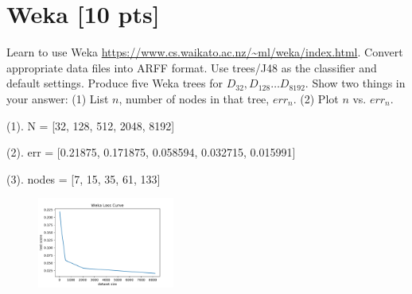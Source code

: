 \documentclass[a4paper]{article}
\theoremstyle{definition}
\newenvironment{soln}{
    \leavevmode\color{blue}\ignorespaces
}{}
\begin{document}
\section{Weka [10 pts]}
Learn to use Weka \url{https://www.cs.waikato.ac.nz/~ml/weka/index.html}.
Convert appropriate data files into ARFF format.
Use trees/J48 as the classifier and default settings.
Produce five Weka trees for $D_{32}, D_{128} \ldots D_{8192}$.  
Show two things in your answer: (1) List $n$, number of nodes in that tree, $err_n$. (2) Plot $n$ vs. $err_n$.

\begin{soln} 
(1). N = [32, 128, 512, 2048, 8192]

(2). err = [0.21875, 0.171875, 0.058594, 0.032715, 0.015991]

(3). nodes = [7, 15, 35, 61, 133]

	    \begin{figure}[H]
	        \centering
	        \includegraphics[width=0.4\textwidth]{Weka.pdf}
	        \captionsetup{labelformat=empty}
	        \caption{}
	        \label{fig:my_label}
	    \end{figure}
\end{soln}


\end{document}
